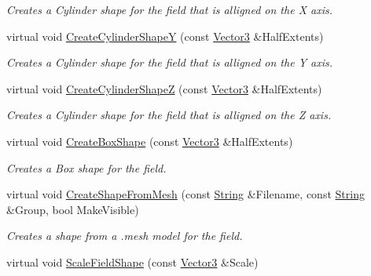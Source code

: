 \begin{DoxyCompactItemize}
\begin{DoxyCompactList}\small\item\em Creates a Cylinder shape for the field that is alligned on the X axis. \item\end{DoxyCompactList}\item 
virtual void \hyperlink{classphys_1_1AreaEffect_aa66eaddac1b2c945bf66346097180506}{CreateCylinderShapeY} (const \hyperlink{classphys_1_1Vector3}{Vector3} \&HalfExtents)
\begin{DoxyCompactList}\small\item\em Creates a Cylinder shape for the field that is alligned on the Y axis. \item\end{DoxyCompactList}\item 
virtual void \hyperlink{classphys_1_1AreaEffect_a23fe0cbe64fd47dd70c62df434352eb4}{CreateCylinderShapeZ} (const \hyperlink{classphys_1_1Vector3}{Vector3} \&HalfExtents)
\begin{DoxyCompactList}\small\item\em Creates a Cylinder shape for the field that is alligned on the Z axis. \item\end{DoxyCompactList}\item 
virtual void \hyperlink{classphys_1_1AreaEffect_a58fe9be01a1c3bdc08ea84cfbf785fdf}{CreateBoxShape} (const \hyperlink{classphys_1_1Vector3}{Vector3} \&HalfExtents)
\begin{DoxyCompactList}\small\item\em Creates a Box shape for the field. \item\end{DoxyCompactList}\item 
virtual void \hyperlink{classphys_1_1AreaEffect_a8b7c0c8c9becb9aad10ac31ad923c0e2}{CreateShapeFromMesh} (const \hyperlink{namespacephys_aa03900411993de7fbfec4789bc1d392e}{String} \&Filename, const \hyperlink{namespacephys_aa03900411993de7fbfec4789bc1d392e}{String} \&Group, bool MakeVisible)
\begin{DoxyCompactList}\small\item\em Creates a shape from a .mesh model for the field. \item\end{DoxyCompactList}\item 
virtual void \hyperlink{classphys_1_1AreaEffect_a140c51a8761f487e1c8f4e7123bb0b31}{ScaleFieldShape} (const \hyperlink{classphys_1_1Vector3}{Vector3} \&Scale)

\end{DoxyCompactItemize}
